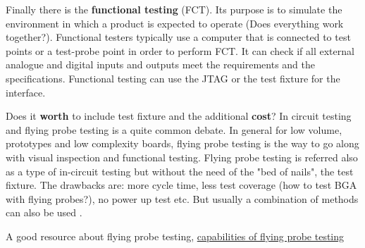 \documentclass[final]{cubedoc}
\begin{document}
	Finally there is the \textbf{functional testing} (FCT). Its purpose is to simulate the environment in which a product is expected to operate (Does everything work together?). Functional testers typically use a computer that is connected to test points or a test-probe point in order to perform FCT.
	It can check if all external analogue and digital inputs and outputs meet the requirements and the specifications. Functional testing can use the JTAG or the test fixture for the interface. 
	
	
	
	Does it \textbf{worth} to include test fixture and the additional \textbf{cost}? In circuit testing and flying probe testing is a quite common debate. In general for low volume, prototypes and low complexity boards, flying probe testing is the way to go along with visual inspection and functional testing. Flying probe testing is referred also as a type of in-circuit testing but without the need of the "bed of nails", the test fixture. The drawbacks are: more cycle time, less test coverage (how to test BGA with flying probes?), no power up test etc. But usually a combination of methods can also be used \cite{matric:flying}. 
	
	
	A good resource about flying probe testing, \href{https://blog.matric.com/flying-probe-test-capabilities}{capabilities of flying probe testing}
	
	
	
	
	
\end{document}
